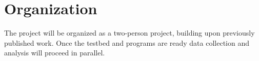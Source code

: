 \section{Organization}
\label{sect:organization}

The project will be organized as a two-person project, building upon previously published work. Once the testbed and programs are ready data collection and analysis will proceed in parallel.
